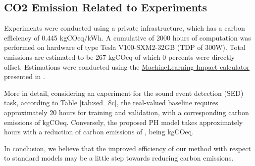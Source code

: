 \documentclass[lettersize,journal]{IEEEtran}
\begin{document}
\subsection*{CO2 Emission Related to Experiments}

Experiments were conducted using a private infrastructure, which has a carbon efficiency of 0.445 kgCOeq/kWh. A cumulative of 2000 hours of computation was performed on hardware of type Tesla V100-SXM2-32GB (TDP of 300W). Total emissions are estimated to be 267 kgCOeq of which 0 percents were directly offset. Estimations were conducted using the \href{https://mlco2.github.io/impact#compute}{MachineLearning Impact calculator} presented in \cite{lacoste2019quantifying}.

More in detail, considering an experiment for the sound event detection (SED) task, according to Table \ref{tab:sed_8c}, the real-valued baseline requires approximately 20 hours for training and validation, with a corresponding carbon emissions of  kgCOeq. Conversely, the proposed PH model takes approximately  hours with a reduction of carbon emissions of , being  kgCOeq.

In conclusion, we believe that the improved efficiency of our method with respect to standard models may be a little step towards reducing carbon emissions.



\end{document}
